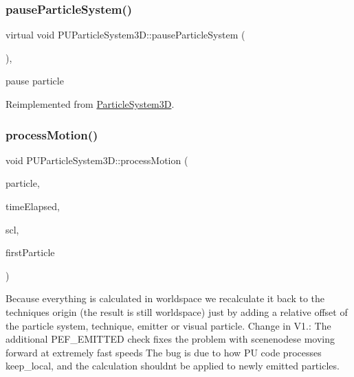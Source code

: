 \mbox{\label{classPUParticleSystem3D_a646df19f678e37df2d1793d7f9a970a2}} 
\subsubsection{\texorpdfstring{pause\+Particle\+System()}{pauseParticleSystem()}\hspace{0.1cm}{\footnotesize\ttfamily [2/2]}}
{\footnotesize\ttfamily virtual void P\+U\+Particle\+System3\+D\+::pause\+Particle\+System (\begin{DoxyParamCaption}{ }\end{DoxyParamCaption})\hspace{0.3cm}{\ttfamily [override]}, {\ttfamily [virtual]}}

pause particle 

Reimplemented from \hyperlink{classParticleSystem3D_ade8abd1ad8b534b6c8485aa43ed8c78e}{Particle\+System3D}.

\mbox{\label{classPUParticleSystem3D_aa1ce823834d5c5a76f98794b3f1f4bf1}} 
\subsubsection{\texorpdfstring{process\+Motion()}{processMotion()}}
{\footnotesize\ttfamily void P\+U\+Particle\+System3\+D\+::process\+Motion (\begin{DoxyParamCaption}\item[{\hyperlink{structPUParticle3D}{P\+U\+Particle3D} $\ast$}]{particle,  }\item[{float}]{time\+Elapsed,  }\item[{const \hyperlink{classVec3}{Vec3} \&}]{scl,  }\item[{bool}]{first\+Particle }\end{DoxyParamCaption})\hspace{0.3cm}{\ttfamily [protected]}}

Because everything is calculated in worldspace we recalculate it back to the techniques\textquotesingle{} origin (the result is still worldspace) just by adding a relative offset of the particle system, technique, emitter or visual particle. Change in V1.\+: The additional P\+E\+F\+\_\+\+E\+M\+I\+T\+T\+ED check fixes the problem with scenenodese moving forward at extremely fast speeds The bug is due to how PU code processes keep\+\_\+local, and the calculation shouldn\textquotesingle{}t be applied to newly emitted particles.

